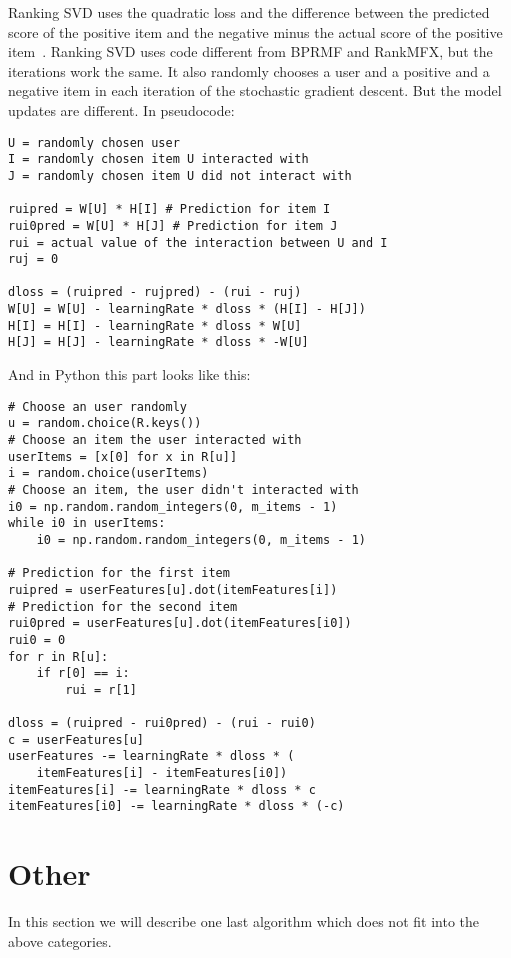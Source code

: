 Ranking SVD uses the quadratic loss and the difference between the
predicted score of the positive item and the negative minus the actual
score of the positive item~\cite{jahrer2011collaborative}.
Ranking SVD uses code different from BPRMF and RankMFX, but the iterations
work the same. It also randomly chooses a user and a positive and a
negative item in each iteration of the stochastic gradient descent. 
But the model updates are different. In pseudocode:
\begin{lstlisting}[style=pseudocode]
U = randomly chosen user
I = randomly chosen item U interacted with
J = randomly chosen item U did not interact with

ruipred = W[U] * H[I] # Prediction for item I
rui0pred = W[U] * H[J] # Prediction for item J
rui = actual value of the interaction between U and I 
ruj = 0

dloss = (ruipred - rujpred) - (rui - ruj)
W[U] = W[U] - learningRate * dloss * (H[I] - H[J])
H[I] = H[I] - learningRate * dloss * W[U]
H[J] = H[J] - learningRate * dloss * -W[U]
\end{lstlisting}
And in Python this part looks like this:
\begin{lstlisting}[style=python]
# Choose an user randomly
u = random.choice(R.keys())
# Choose an item the user interacted with
userItems = [x[0] for x in R[u]]
i = random.choice(userItems)
# Choose an item, the user didn't interacted with
i0 = np.random.random_integers(0, m_items - 1)
while i0 in userItems:
    i0 = np.random.random_integers(0, m_items - 1)

# Prediction for the first item
ruipred = userFeatures[u].dot(itemFeatures[i])
# Prediction for the second item
rui0pred = userFeatures[u].dot(itemFeatures[i0])
rui0 = 0
for r in R[u]:
    if r[0] == i:
        rui = r[1]

dloss = (ruipred - rui0pred) - (rui - rui0)
c = userFeatures[u]
userFeatures -= learningRate * dloss * (
    itemFeatures[i] - itemFeatures[i0])
itemFeatures[i] -= learningRate * dloss * c
itemFeatures[i0] -= learningRate * dloss * (-c)
\end{lstlisting}


\section{Other}
In this section we will describe one last algorithm 
which does not fit into the above categories.
